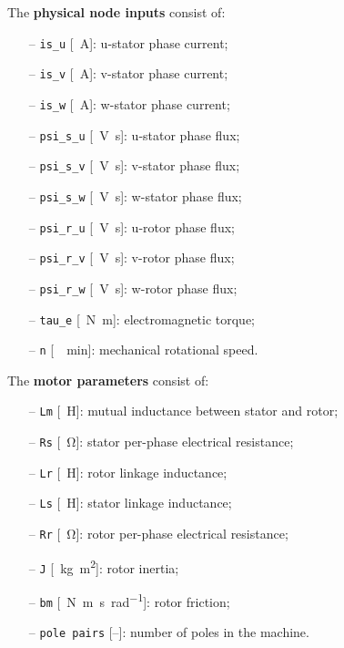 \documentclass[11pt,a4paper,oneside]{book}
\numberwithin{equation}{section}
\theoremstyle{it}
\theoremstyle{definition}
\begin{document}
\noindent The \textbf{physical node inputs} consist of: 
\begin{itemize}
	\item[--] \texttt{is\_u} [\SI{}{\ampere}]: u-stator phase current;
	\item[--] \texttt{is\_v} [\SI{}{\ampere}]: v-stator phase current;
	\item[--] \texttt{is\_w} [\SI{}{\ampere}]: w-stator phase current;
	\item[--] \texttt{psi\_s\_u} [\SI{}{\volt\second}]: u-stator phase flux;
	\item[--] \texttt{psi\_s\_v} [\SI{}{\volt\second}]: v-stator phase flux;
	\item[--] \texttt{psi\_s\_w} [\SI{}{\volt\second}]: w-stator phase flux;
	\item[--] \texttt{psi\_r\_u} [\SI{}{\volt\second}]: u-rotor phase flux;
	\item[--] \texttt{psi\_r\_v} [\SI{}{\volt\second}]: v-rotor phase flux;
	\item[--] \texttt{psi\_r\_w} [\SI{}{\volt\second}]: w-rotor phase flux;
	\item[--] \texttt{tau\_e} [\SI{}{\newton\meter}]: electromagnetic torque;
	\item[--] \texttt{n} [\SI{}{\per\minute}]: mechanical rotational speed.
\end{itemize} 

\noindent The \textbf{motor parameters} consist of:
\begin{itemize}
	\item[--] \texttt{Lm} [\SI{}{\henry}]: mutual inductance between stator and rotor;
	\item[--] \texttt{Rs} [\SI{}{\ohm}]: stator per-phase electrical resistance;
	\item[--] \texttt{Lr} [\SI{}{\henry}]: rotor linkage inductance;
	\item[--] \texttt{Ls} [\SI{}{\henry}]: stator linkage inductance;
	\item[--] \texttt{Rr} [\SI{}{\ohm}]: rotor per-phase electrical resistance;
	\item[--] \texttt{J} [\SI{}{\kilogram\square\meter}]: rotor inertia;
	\item[--] \texttt{bm} [\SI{}{\newton\meter\second\per\radian}]: rotor friction;
	\item[--] \texttt{pole pairs} [--]: number of poles in the machine.
\end{itemize}
\end{document}
